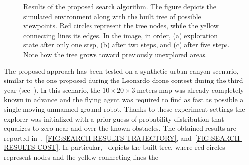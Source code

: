 \begin{figure}[!t]
\begin{center}
\begin{minipage}{.4\linewidth}
		\end{minipage}
		\begin{minipage}{.4\linewidth}
			\centering
		\end{minipage}
	\end{center}
	\caption{Results of the proposed search algorithm. The figure depicts the simulated environment along with the built
	tree of possible viewpoints. Red circles represent the tree nodes, while the yellow connecting lines its edges.
	In the image, in order, (a) exploration state after only one step, (b) after two steps, and (c) after five steps.
	Note how the tree grows toward previously unexplored areas.}\label{FIG:SEARCH-RESULTS-MAP}
\end{figure}
The proposed approach has been tested on a synthetic urban canyon scenario, similar to the one proposed during the Leonardo drone
contest during the third year (see~). In this scenario, the $10 \times 20 \times 3$ meters map was already completely
known in advance and the flying agent was required to find as fast as possible a single moving unmanned ground robot. Thanks to these experiment
settings the explorer was initialized with a prior guess of probability distribution that equalizes to zero near and over the known
obstacles. The obtained results are reported in~,~\ref{FIG:SEARCH-RESULTS-TRAJECTORY}, and~\ref{FIG:SEARCH-RESULTS-COST}.
In particular,~ depicts the built tree, where red circles represent nodes and the yellow connecting lines the
